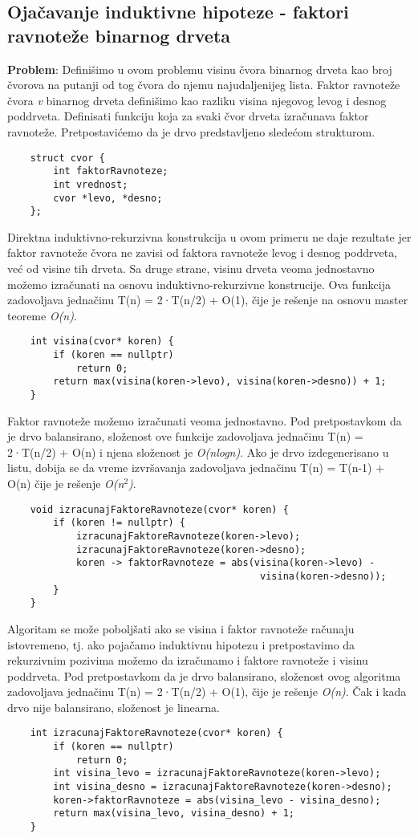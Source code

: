 \documentclass{article}
\begin{document}
\subsection{Ojačavanje induktivne hipoteze - faktori ravnoteže binarnog drveta}
\textbf{Problem}: Definišimo u ovom problemu visinu čvora binarnog drveta kao broj čvorova na putanji od tog čvora do njemu najudaljenijeg lista. Faktor ravnoteže čvora \textit{v} binarnog drveta definišimo kao razliku visina njegovog levog i desnog
poddrveta. Definisati funkciju koja za svaki čvor drveta izračunava faktor ravnoteže.
\newline Pretpostavićemo da je drvo predstavljeno sledećom strukturom.
\begin{lstlisting}
    struct cvor {
        int faktorRavnoteze;
        int vrednost;
        cvor *levo, *desno;
    };
\end{lstlisting}
Direktna induktivno-rekurzivna konstrukcija u ovom primeru ne daje rezultate jer faktor ravnoteže čvora ne zavisi od faktora ravnoteže levog i desnog poddrveta, već od visine tih drveta. Sa druge strane, visinu drveta veoma jednostavno možemo izračunati na osnovu induktivno-rekurzivne konstrucije. Ova funkcija
zadovoljava jednačinu T(n) = 2·T(n/2) + O(1), čije je rešenje na osnovu master teoreme \textit{O(n)}.
\begin{lstlisting}
    int visina(cvor* koren) {
        if (koren == nullptr)
            return 0;
        return max(visina(koren->levo), visina(koren->desno)) + 1;
    }
\end{lstlisting}
Faktor ravnoteže možemo izračunati veoma jednostavno. Pod pretpostavkom da je drvo balansirano, složenost ove funkcije
zadovoljava jednačinu T(n) = 2·T(n/2) + O(n) i njena složenost je \textit{O(nlogn)}. Ako je drvo izdegenerisano u listu, dobija se da vreme izvršavanja zadovoljava jednačinu T(n) = T(n-1) + O(n) čije je rešenje \textit{O(n$^2$)}.
\begin{lstlisting}
    void izracunajFaktoreRavnoteze(cvor* koren) {
        if (koren != nullptr) {
            izracunajFaktoreRavnoteze(koren->levo);
            izracunajFaktoreRavnoteze(koren->desno);
            koren -> faktorRavnoteze = abs(visina(koren->levo) -
                                            visina(koren->desno));
        }
    }
\end{lstlisting}
Algoritam se može poboljšati ako se visina i faktor ravnoteže računaju istovremeno, tj. ako pojačamo induktivnu hipotezu i pretpostavimo da rekurzivnim
pozivima možemo da izračunamo i faktore ravnoteže i visinu poddrveta. Pod pretpostavkom da je drvo balansirano, složenost ovog algoritma zadovoljava jednačinu T(n) = 2·T(n/2) + O(1), čije je rešenje \textit{O(n)}. Čak i kada drvo nije balansirano, složenost je linearna.
\begin{lstlisting}
    int izracunajFaktoreRavnoteze(cvor* koren) {
        if (koren == nullptr)
            return 0;
        int visina_levo = izracunajFaktoreRavnoteze(koren->levo);
        int visina_desno = izracunajFaktoreRavnoteze(koren->desno);
        koren->faktorRavnoteze = abs(visina_levo - visina_desno);
        return max(visina_levo, visina_desno) + 1;
    }
\end{lstlisting}
\end{document}
